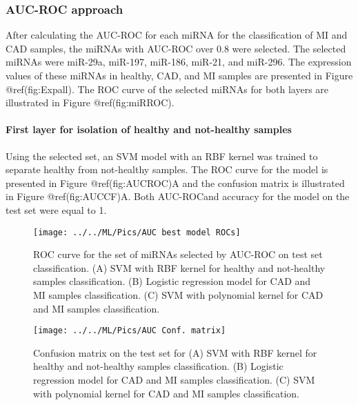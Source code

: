 \documentclass[smallextended]{svjour3}       %
\begin{document}
\hypertarget{auc-roc-approach}{%
\subsubsection{AUC-ROC approach}\label{auc-roc-approach}}

After calculating the AUC-ROC for each miRNA for the classification of
MI and CAD samples, the miRNAs with AUC-ROC over 0.8 were selected. The
selected miRNAs were miR-29a, miR-197, miR-186, miR-21, and miR-296. The
expression values of these miRNAs in healthy, CAD, and MI samples are
presented in Figure @ref(fig:Expall). The ROC curve of the selected
miRNAs for both layers are illustrated in Figure @ref(fig:miRROC).

\hypertarget{first-layer-for-isolation-of-healthy-and-not-healthy-samples-1}{%
\paragraph{First layer for isolation of healthy and not-healthy
samples}\label{first-layer-for-isolation-of-healthy-and-not-healthy-samples-1}}

Using the selected set, an SVM model with an RBF kernel was trained to
separate healthy from not-healthy samples. The ROC curve for the model
is presented in Figure @ref(fig:AUCROC)A and the confusion matrix is
illustrated in Figure @ref(fig:AUCCF)A. Both AUC-ROCand accuracy for the
model on the test set were equal to 1.

\begin{figure}

{\centering \texttt{[image: ../../ML/Pics/AUC best model ROCs]} 

}

\caption{ROC curve for the set of miRNAs selected by AUC-ROC on test set classification. (A) SVM with RBF kernel for healthy and not-healthy samples classification. (B) Logistic regression model for CAD and MI samples classification. (C) SVM with polynomial kernel for CAD and MI samples classification. }\label{fig:AUCROC}
\end{figure}

\begin{figure}

{\centering \texttt{[image: ../../ML/Pics/AUC Conf. matrix]} 

}

\caption{Confusion matrix on the test set for (A) SVM with RBF kernel for healthy and not-healthy samples classification. (B) Logistic regression model for CAD and MI samples classification. (C) SVM with polynomial kernel for CAD and MI samples classification.}\label{fig:AUCCF}
\end{figure}
\end{document}
